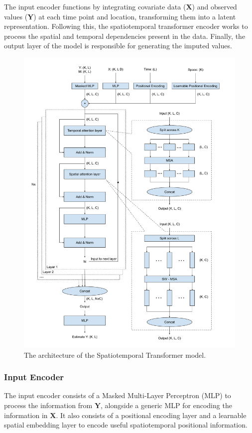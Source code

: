 \documentclass[review]{elsarticle}
\begin{document}
The input encoder functions by integrating covariate data ($\boldsymbol{X}$) and observed values ($\boldsymbol{Y}$) at each time point and location, transforming them into a latent representation. Following this, the spatiotemporal transformer encoder works to process the spatial and temporal dependencies present in the data. Finally, the output layer of the model is responsible for generating the imputed values. 



\begin{figure}
\centering
\includegraphics[width=\textwidth]{figure/st_transformer.pdf}
\caption{The architecture of the Spatiotemporal Transformer model.}
\label{fig: st_transformer}
\end{figure}




\subsubsection*{Input Encoder} 
The input encoder consists of a Masked Multi-Layer Perceptron (MLP) to process the information from $\boldsymbol{Y}$, alongside a generic MLP for encoding the information in $\boldsymbol{X}$. It also consists of a positional encoding layer and a learnable spatial embedding layer to encode useful spatiotemporal positional information.
\end{document}
